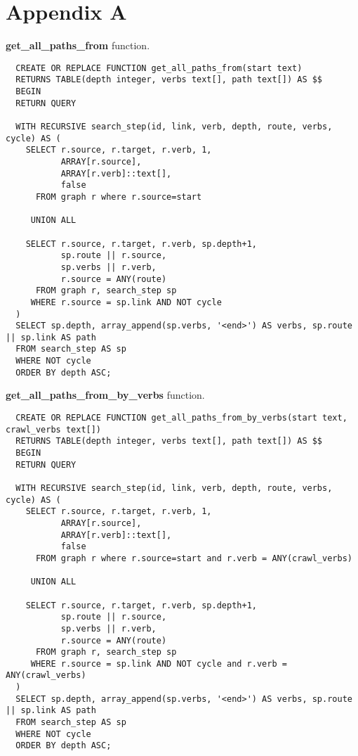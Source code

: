 \section*{Appendix A}
\label{appendix:tenmo-sql-queries-impl}

\textbf{get\_all\_paths\_from} function.

\begin{verbatim}
  CREATE OR REPLACE FUNCTION get_all_paths_from(start text)
  RETURNS TABLE(depth integer, verbs text[], path text[]) AS $$
  BEGIN
  RETURN QUERY

  WITH RECURSIVE search_step(id, link, verb, depth, route, verbs, cycle) AS (
    SELECT r.source, r.target, r.verb, 1,
           ARRAY[r.source],
           ARRAY[r.verb]::text[],
           false
      FROM graph r where r.source=start

     UNION ALL

    SELECT r.source, r.target, r.verb, sp.depth+1,
           sp.route || r.source,
           sp.verbs || r.verb,
           r.source = ANY(route)
      FROM graph r, search_step sp
     WHERE r.source = sp.link AND NOT cycle
  )
  SELECT sp.depth, array_append(sp.verbs, '<end>') AS verbs, sp.route || sp.link AS path
  FROM search_step AS sp
  WHERE NOT cycle
  ORDER BY depth ASC;
\end{verbatim}

\textbf{get\_all\_paths\_from\_by\_verbs} function.

\begin{verbatim}
  CREATE OR REPLACE FUNCTION get_all_paths_from_by_verbs(start text, crawl_verbs text[])
  RETURNS TABLE(depth integer, verbs text[], path text[]) AS $$
  BEGIN
  RETURN QUERY

  WITH RECURSIVE search_step(id, link, verb, depth, route, verbs, cycle) AS (
    SELECT r.source, r.target, r.verb, 1,
           ARRAY[r.source],
           ARRAY[r.verb]::text[],
           false
      FROM graph r where r.source=start and r.verb = ANY(crawl_verbs)

     UNION ALL

    SELECT r.source, r.target, r.verb, sp.depth+1,
           sp.route || r.source,
           sp.verbs || r.verb,
           r.source = ANY(route)
      FROM graph r, search_step sp
     WHERE r.source = sp.link AND NOT cycle and r.verb = ANY(crawl_verbs)
  )
  SELECT sp.depth, array_append(sp.verbs, '<end>') AS verbs, sp.route || sp.link AS path
  FROM search_step AS sp
  WHERE NOT cycle
  ORDER BY depth ASC;
\end{verbatim}

